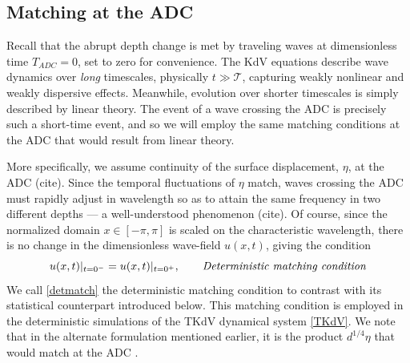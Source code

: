\documentclass[11pt]{article}
\newcommand{\nick}[1]{{\color{red} #1}}
\newcommand{\mean}[1]{\left< #1 \right>}
\newcommand{\CC}{{\mathbb{C}}}
\newcommand{\depth}{d}
\newcommand{\timescale}{\mathcal{T}}
\newcommand{\Gibbs}{\mathcal{G}}
\newcommand{\Gz}{\Gibbs_0}
\newcommand{\tavg}[1]{\overline{#1}}
\begin{document}

\subsection{Matching at the ADC}

	Recall that the abrupt depth change is met by traveling waves at dimensionless time $T_{ADC} = 0$, set to zero for convenience. The KdV equations describe wave dynamics over {\em long} timescales, physically $t \gg \timescale$, capturing weakly nonlinear and weakly dispersive effects. Meanwhile, evolution over shorter timescales is simply described by linear theory. The event of a wave crossing the ADC is precisely such a short-time event, and so we will employ the same matching conditions at the ADC that would result from linear theory. 

	More specifically, we assume continuity of the surface displacement, $\eta$, at the ADC \nick{(cite)}. Since the temporal fluctuations of $\eta$ match, waves crossing the ADC must rapidly adjust in wavelength so as to attain the same frequency in two different depths --- a well-understood phenomenon \nick{(cite)}. Of course, since the normalized domain $x \in [-\pi,\pi]$ is scaled on the characteristic wavelength, there is no change in the dimensionless wave-field $u(x,t)$, giving the condition
\begin{equation}
\label{detmatch}
u(x,t) \vert_{t=0^-} = u(x,t) \vert_{t=0^+}, 
\qquad \mbox{\em Deterministic matching condition}
\end{equation}	
We call \eqref{detmatch} the deterministic matching condition to contrast with its statistical counterpart introduced below. This matching condition is employed in the deterministic simulations of the TKdV dynamical system \eqref{TKdV}. We note that in the alternate formulation mentioned earlier, it is the product $\depth^{1/4} \eta$ that would match at the ADC \cite{johnson1997modern}.
\end{document}
